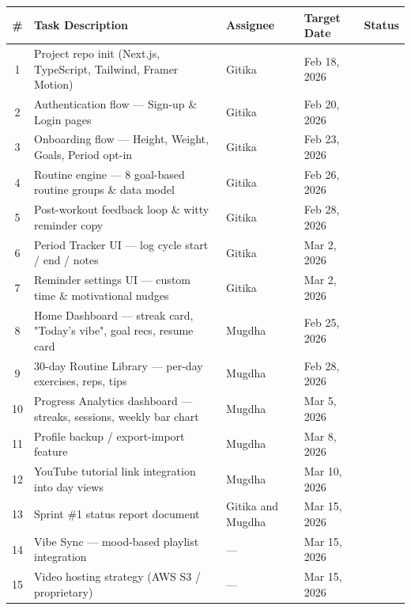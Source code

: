 \documentclass[11pt, letterpaper]{article}
\newcommand{\done}{\textcolor{greentick}{\ding{52}}}
\newcommand{\pend}{\textcolor{orangewarn}{\ding{119}}}
\begin{document}
\begin{center}
\renewcommand{\arraystretch}{1.35}
\fontsize{9.5}{12}\selectfont
\begin{tabularx}{\linewidth}{|c|X|l|l|c|}
  \hline
  \rowcolor{tabhead}
  \color{white}\textbf{\#} &
  \color{white}\textbf{Task Description} &
  \color{white}\textbf{Assignee} &
  \color{white}\textbf{Target Date} &
  \color{white}\textbf{Status} \\
  \hline
  1 & Project repo init (Next.js, TypeScript, Tailwind, Framer Motion) & Gitika & Feb 18, 2026 & \done \\
  \hline
  \rowcolor{lightbg}
  2 & Authentication flow — Sign-up \& Login pages & Gitika & Feb 20, 2026 & \done \\
  \hline
  3 & Onboarding flow — Height, Weight, Goals, Period opt-in & Gitika & Feb 23, 2026 & \done \\
  \hline
  \rowcolor{lightbg}
  4 & Routine engine — 8 goal-based routine groups \& data model & Gitika & Feb 26, 2026 & \done \\
  \hline
  5 & Post-workout feedback loop \& witty reminder copy & Gitika & Feb 28, 2026 & \done \\
  \hline
  \rowcolor{lightbg}
  6 & Period Tracker UI — log cycle start / end / notes & Gitika & Mar 2, 2026 & \done \\
  \hline
  7 & Reminder settings UI — custom time \& motivational nudges & Gitika & Mar 2, 2026 & \done \\
  \hline
  \rowcolor{lightbg}
  8 & Home Dashboard — streak card, "Today's vibe", goal recs, resume card & Mugdha & Feb 25, 2026 & \done \\
  \hline
  9 & 30-day Routine Library — per-day exercises, reps, tips & Mugdha & Feb 28, 2026 & \done \\
  \hline
  \rowcolor{lightbg}
  10 & Progress Analytics dashboard — streaks, sessions, weekly bar chart & Mugdha & Mar 5, 2026 & \done \\
  \hline
  11 & Profile backup / export-import feature & Mugdha & Mar 8, 2026 & \done \\
  \hline
  \rowcolor{lightbg}
  12 & YouTube tutorial link integration into day views & Mugdha & Mar 10, 2026 & \done \\
  \hline
  13 & Sprint \#1 status report document & Gitika and Mugdha & Mar 15, 2026 & \done \\
  \hline
  \rowcolor{lightbg}
  14 & Vibe Sync — mood-based playlist integration & — & Mar 15, 2026 & \pend \\
  \hline
  15 & Video hosting strategy (AWS S3 / proprietary) & — & Mar 15, 2026 & \pend \\
  \hline
\end{tabularx}
\end{center}
\end{document}
